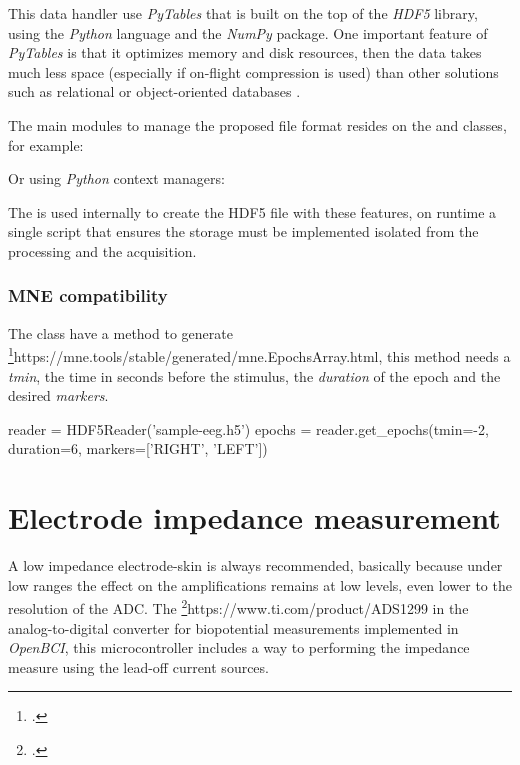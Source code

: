 This data handler use \textit{PyTables} that is built on the top of the \textit{HDF5} library, using the \textit{Python} language and the \textit{NumPy} package. One important feature of \textit{PyTables} is that it optimizes memory and disk resources, then the data takes much less space (especially if on-flight compression is used) than other solutions such as relational or object-oriented databases \cite{Welcomet25:online}.

The main modules to manage the proposed file format resides on the  and  classes, for example:



Or using \textit{Python} context managers:



The  is used internally to create the \gls*{HDF}5 file with these features, on runtime a single script that ensures the storage must be implemented isolated from the processing and the acquisition. 

\subsubsection{MNE compatibility}

The class  have a method to generate \footcite{mne.EpochsArray}{https://mne.tools/stable/generated/mne.EpochsArray.html}, this method needs a \textit{tmin}, the time in seconds before the stimulus, the \textit{duration} of the epoch and the desired \textit{markers}.

\begin{python}
reader = HDF5Reader('sample-eeg.h5')
epochs = reader.get_epochs(tmin=-2, duration=6, markers=['RIGHT', 'LEFT'])
\end{python}

\section{Electrode impedance measurement}\label{subsec:impedance-measurement}

A low impedance electrode-skin is always recommended, basically because under low ranges the effect on the amplifications remains at low levels, even lower to the resolution of the \Gls*{ADC}. The \footcite{ADS1299}{https://www.ti.com/product/ADS1299} in the analog-to-digital converter for biopotential measurements implemented in \textit{OpenBCI}, this microcontroller includes a way to performing the impedance measure using the lead-off current sources. 

